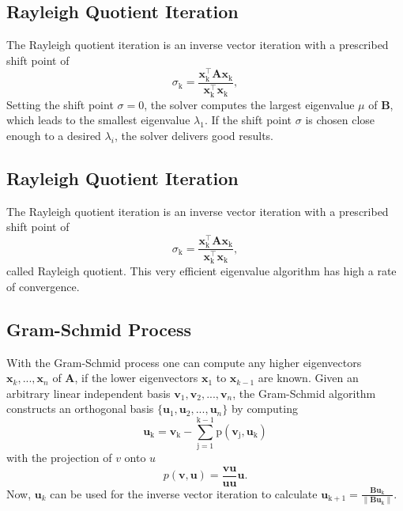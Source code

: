\documentclass[conference]{journal}
\begin{document}
	\subsection*{Rayleigh Quotient Iteration}
	The Rayleigh quotient iteration is an inverse vector iteration with a prescribed shift point of
	\begin{equation}
	\sigma_{\mathrm{k}}=\frac{\textbf{\^x}_{\mathrm{k}}^\intercal\textbf{A\^x}_{\mathrm{k}}}{\textbf{\^x}_{\mathrm{k}}^\intercal\textbf{\^x}_{\mathrm{k}}},
	\end{equation}
	Setting the shift point $\sigma=0$, the solver computes the largest eigenvalue $\mu$ of $\textbf{B}$, which leads to the smallest eigenvalue $\lambda_1$. If the shift point $\sigma$ is chosen close enough to a desired $\lambda_i$, the solver delivers good results.
	
	\subsection*{Rayleigh Quotient Iteration}
	The Rayleigh quotient iteration is an inverse vector iteration with a prescribed shift point of
	\begin{equation}
	\sigma_{\mathrm{k}}=\frac{\textbf{\^x}_{\mathrm{k}}^\intercal\textbf{A\^x}_{\mathrm{k}}}{\textbf{\^x}_{\mathrm{k}}^\intercal\textbf{\^x}_{\mathrm{k}}},
	\end{equation}
	called Rayleigh quotient. This very efficient eigenvalue algorithm has high a rate of convergence.
	
	\subsection*{Gram-Schmid Process}
	With the Gram-Schmid process one can compute any higher eigenvectors $\textbf{\^x}_k,...,\textbf{\^x}_n$ of 
	$\textbf{A}$, if the lower eigenvectors $\textbf{\^x}_1$ to $\textbf{\^x}_{k-1}$ are known. Given an arbitrary linear independent basis $\textbf{v} _1, \textbf{v}_2, ..., \textbf{v}_n$, the Gram-Schmid algorithm constructs an orthogonal basis $\{\textbf{u}_1, \textbf{u}_2,..., \textbf{u}_n\}$ by computing 
	\begin{equation}
	\textbf{u}_{\mathrm{k}} = \textbf{v}_{\mathrm{k}} -\sum_{\mathrm{j=1}}^{\mathrm{k-1}}\mathrm{p}(\textbf{v}_{\mathrm{j}},\textbf{u}_{\mathrm{k}})
	\end{equation}
	with the projection of $v$ onto $u$
	\begin{equation}
	p(\textbf{v},\textbf{u})=\frac{\textbf{v}\textbf{u}}{\textbf{u}\textbf{u}}\textbf{u}.
	\end{equation}
	Now, $\textbf{u}_k$ can be used for the inverse vector iteration to calculate
	$\textbf{u}_\mathrm{k+1}=\frac{\textbf{Bu}_\mathrm{k}}{\lVert \textbf{Bu}_\mathrm{k} \rVert}$.
	
\end{document}
